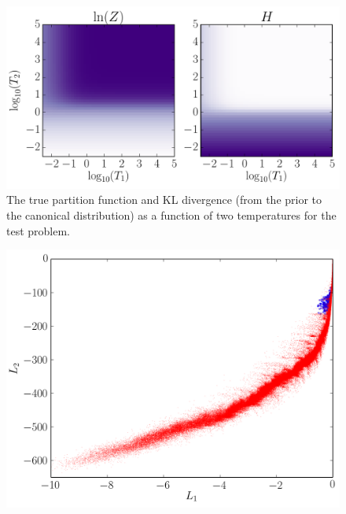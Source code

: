 \documentclass[journal,article,accept,moreauthors,pdftex,12pt,a4paper]{mdpi}
\begin{document}
\begin{figure}
\centering
\includegraphics[scale=0.75]{figures/truth.pdf}
\caption{The true partition function and KL divergence (from the prior to
the canonical distribution) as a function of two temperatures for the
test problem.\label{fig:truth}}
\end{figure}


\begin{figure}
\centering
\includegraphics[scale=0.75]{figures/output.png}
\caption{\label{fig:output}}
\end{figure}
\end{document}
